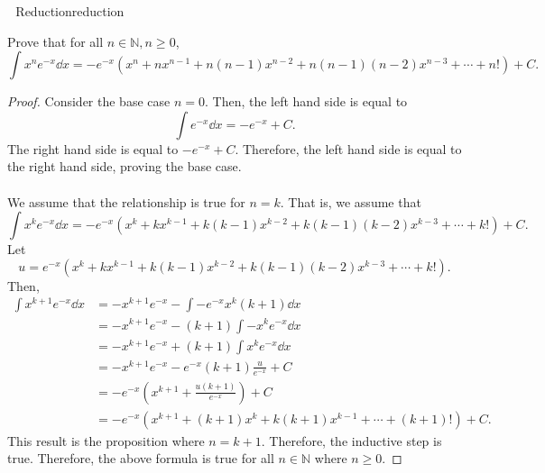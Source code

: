         \begin{exercise}{\Difficulty\,\Difficulty\,\Difficulty\,\,Reduction}{reduction}
        
            Prove that for all \(n\in\mathbb{N}, n \geq 0\),
            \begin{equation*}
                \int x^ne^{-x}\dd x = -e^{-x}\left(x^n+nx^{n-1}+n(n-1)x^{n-2}+n(n-1)(n-2)x^{n-3}+\cdots + n! \right)+C.
            \end{equation*}
            \begin{proof}
                Consider the base case \(n=0\). Then, the left hand side is equal to
                \begin{equation*}
                    \int e^{-x} \dd x=-e^{-x}+C.
                \end{equation*}
                The right hand side is equal to \(-e^{-x}+C\). Therefore, the left hand side is equal to the right hand side, proving the base case.
                \\
                \\
                We assume that the relationship is true for \(n=k\). That is, we assume that
                \begin{equation*}
                    \int x^ke^{-x}\dd x = -e^{-x}(x^k+kx^{k-1}+k(k-1)x^{k-2}+k(k-1)(k-2)x^{k-3}+\cdots + k!)+C.
                \end{equation*}
                Let
                \begin{equation*}
                    u=e^{-x}(x^k+kx^{k-1}+k(k-1)x^{k-2}+k(k-1)(k-2)x^{k-3}+\cdots + k!).
                \end{equation*}
                Then,
                \begin{align*}
                    \int x^{k+1}e^{-x}\dd x&=-x^{k+1}e^{-x}-\int -e^{-x}x^k(k+1) \dd x \\
                    &=-x^{k+1}e^{-x}-(k+1)\int -x^ke^{-x} \dd x \\
                    &=-x^{k+1}e^{-x}+(k+1)\int x^ke^{-x} \dd x \\
                    &=-x^{k+1}e^{-x}-e^{-x}(k+1)\frac{u}{e^{-x}}+C \\
                    &=-e^{-x}\left(x^{k+1}+\frac{u(k+1)}{e^{-x}}\right)+C \\
                    &=-e^{-x}\left(x^{k+1}+(k+1)x^k+k(k+1)x^{k-1}+\cdots+(k+1)!\right)+C.
                \end{align*}
                    This result is the proposition where \(n=k+1\). Therefore, the inductive step is true. Therefore, the above formula is true for all \(n\in\mathbb{N}\) where \(n \geq 0\).
            \end{proof}
        \end{exercise}
